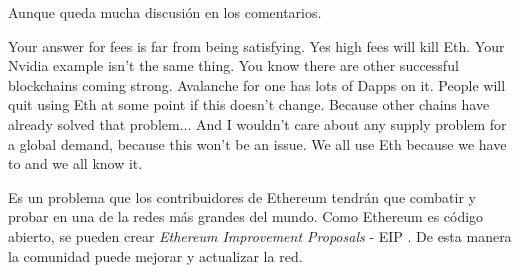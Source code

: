Aunque queda mucha discusión en los comentarios.
\begin{displayquote}
    Your answer for fees is far from being satisfying. Yes high fees will kill Eth. Your Nvidia example isn't the same thing.
    You know there are other successful blockchains coming strong. Avalanche for one has lots of Dapps on it. People will quit using Eth at some point if this doesn't change. Because other chains have already solved that problem...
    And I wouldn't care about any supply problem for a global demand, because this won't be an issue. We all use Eth because we have to and we all know it.
    \cite{web:reddit_ethereum_comment}
\end{displayquote}
Es un problema que los contribuidores de Ethereum tendrán que combatir y probar en una de la redes más grandes del mundo. Como Ethereum es código abierto, se pueden crear \textit{Ethereum Improvement Proposals} - EIP \cite{web:EIP}. De esta manera la comunidad puede mejorar y actualizar la red.
